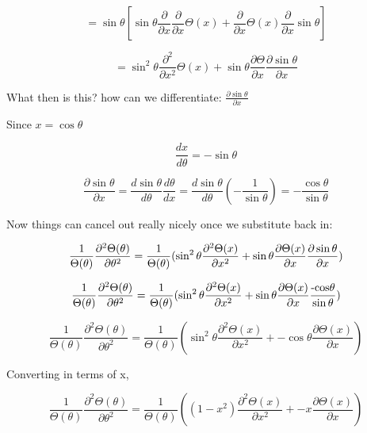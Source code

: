 \documentclass[12pt]{article}
\renewcommand{\_}{\kern-1.5pt\textunderscore\kern-1.5pt}
\begin{document}
 \[ =\sin  \theta  \left[ \sin  \theta \frac{ \partial }{ \partial x}\frac{ \partial }{ \partial x} \Theta  \left( x \right) +\frac{ \partial }{ \partial x} \Theta  \left( x \right) \frac{ \partial }{ \partial x}\sin  \theta  \right]  \] \par

 \[ =\sin ^{2} \theta \frac{ \partial ^{2}}{ \partial x^{2}} \Theta  \left( x \right) +\sin  \theta \frac{ \partial  \Theta }{ \partial x}\frac{ \partial \sin  \theta }{ \partial x} \] \par

What then is this? how can we differentiate:  \( \frac{ \partial \sin  \theta }{ \partial x} \) \par

Since  \( x=\cos  \theta  \) \par

 \[ \frac{dx}{d \theta }=-\sin  \theta  \] \par

 \[ \frac{ \partial \sin  \theta }{ \partial x}=\frac{d\sin  \theta }{d \theta }\frac{d \theta }{dx}=\frac{d\sin  \theta }{d \theta } \left( -\frac{1}{\sin  \theta } \right) =-\frac{\cos  \theta }{\sin  \theta } \] \par

Now things can cancel out really nicely once we substitute back in:\par

\[
\frac{1}{\Theta(\theta)}\frac{\partial^{2}\Theta(\theta)}{\partial\theta^{2}}=\frac{1}{\Theta(\theta)}(\sin^{2}\theta\frac{\partial^{2}\Theta(x)}{\partial x^{2}}+\sin\theta\frac{\partial\Theta(x)}{\partial x}\frac{\text{\ensuremath{\partial\sin\theta}}}{\partial x})
\]

\[
\frac{1}{\Theta(\theta)}\frac{\partial^{2}\Theta(\theta)}{\partial\theta^{2}}=\frac{1}{\Theta(\theta)}(\sin^{2}\theta\frac{\partial^{2}\Theta(x)}{\partial x^{2}}+\sin\theta\frac{\partial\Theta(x)}{\partial x}\frac{\text{-\ensuremath{\cos}\ensuremath{\theta}}}{\sin\theta})
\]

\[
\frac{1}{\Theta(\theta)}\frac{\partial^{2}\Theta(\theta)}{\partial\theta^{2}}=\frac{1}{\Theta(\theta)}(\sin^{2}\theta\frac{\partial^{2}\Theta(x)}{\partial x^{2}}+-\cos\theta\frac{\partial\Theta(x)}{\partial x})
\]

Converting in terms of x,\par

\[
\frac{1}{\Theta(\theta)}\frac{\partial^{2}\Theta(\theta)}{\partial\theta^{2}}=\frac{1}{\Theta(\theta)}((1-x^{2})\frac{\partial^{2}\Theta(x)}{\partial x^{2}}+-x\frac{\partial\Theta(x)}{\partial x})
\]
\end{document}

